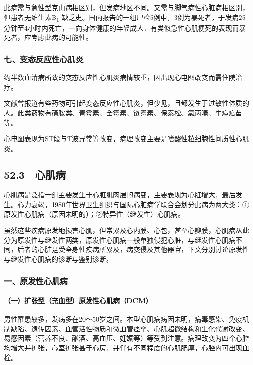 此病需与急性型克山病相区别，但发病地区不同。又需与脚气病性心脏病相区别，但患者无维生素B\textsubscript{1}
缺乏史。国内报告的一组尸检5例中，3例为暴死者，于发病25分钟至4小时内死亡，一向身体健康的年轻成人，有类似急性心肌梗死的表现而暴死者，应考虑此病的可能性。

\subsubsection{七、变态反应性心肌炎}

约半数血清病所致的变态反应性心肌炎病情较重，因出现心电图改变而需住院治疗。

文献曾报道有些药物可引起变态反应性心肌炎，但少见，且都发生于过敏性体质的人。此类药物有磺胺类、青霉素、金霉素、链霉素、保泰松、氯丙嗪、牛痘疫苗等。

心电图表现为ST段与T波异常等改变，病理改变主要是嗜酸性粒细胞性间质性心肌炎。

\protect\hypertarget{text00139.html}{}{}

\subsection{52.3　心肌病}

心肌病是泛指一组主要发生于心脏肌肉层的病变，主要表现为心脏增大，最后发生。心力衰竭，1980年世界卫生组织与国际心脏病学联合会划分此病为两大类：①原发性心肌病（原因未明的）；②特异性（继发性）心肌病。

虽然这些疾病原发地损害心肌，但常累及心内膜、心包，甚至心瓣膜，心肌病从此分为原发性与继发性两类，原发性心肌病一般单独侵犯心脏，与继发性心肌病不同，后者的心脏是受全身性疾病所累及，病变侵及其他器官，下文分别讨论原发性与继发性心肌病的诊断与鉴别诊断。

\subsubsection{一、原发性心肌病}

\paragraph{（一）扩张型（充血型）原发性心肌病（DCM）}

男性罹患较多，发病多在20～50岁之间。本型心肌病病因未明，病毒感染、免疫机制缺陷、遗传因素、血管活性物质和微血管痉挛、心肌超微结构和生化代谢改变、易感因素（营养不良、酗酒、高血压、妊娠等）等受到注意。病理改变为四个心腔均增大并扩张，心室扩张甚于心房，并伴有不同程度的心肌肥厚，心腔内可出现血栓。

